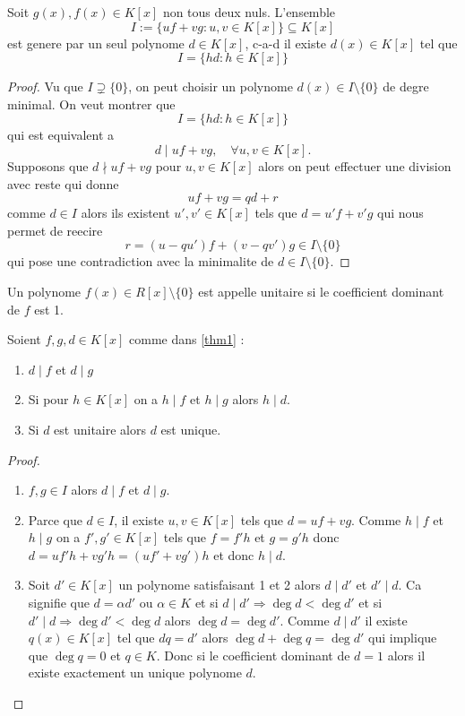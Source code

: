 \begin{theorem}\label{thm1}
Soit $g(x),f(x)\in K[x]$ non tous deux nuls. L'ensemble
$$
I :=  \{uf+vg:u,v\in K[x] \}\subseteq K[x]
$$
est genere par un seul polynome $d\in K[x]$, c-a-d il existe $d(x)\in K[x]$ tel que
$$
I=\{ hd:h\in K[x] \}
$$
\end{theorem}
\begin{proof}
Vu que $I\supsetneq\{ 0 \}$, on peut choisir un polynome $d(x)\in I\setminus \{ 0 \}$ de degre minimal. On veut montrer que 
$$
I=\{ hd:h\in K[x] \}
$$
qui est equivalent a 
$$
d\mid uf+vg,\quad\forall u,v\in K[x].
$$
Supposons que $d\nmid uf+vg$ pour $u,v\in K[x]$ alors on peut effectuer une division avec reste qui donne
$$
uf+vg=qd+r
$$
comme $d\in I$ alors ils existent $u',v'\in K[x]$ tels que $d=u'f+v'g$ qui nous permet de reecire
$$
r=(u-qu')f+(v-qv')g\in I\setminus \{ 0 \}
$$
qui pose une contradiction avec la minimalite de $d\in I\setminus \{ 0 \}$.
\end{proof}
\begin{definition}
Un polynome $f(x)\in R[x]\setminus \{ 0 \}$ est appelle unitaire si le coefficient dominant de $f$ est 1.
\end{definition}
\begin{theorem}
Soient $f,g,d\in K[x]$ comme dans \ref{thm1} :
\begin{enumerate}
\item $d\mid f$ et $d\mid g$
\item Si pour $h\in K[x]$ on a $h\mid f$ et $h\mid g$ alors $h\mid d$.
\item Si $d$ est unitaire alors $d$ est unique.
\end{enumerate}
\end{theorem}
\begin{proof}
\begin{enumerate}
\item $f,g\in I$ alors $d\mid f$ et $d\mid g$.
\item Parce que $d\in I$, il existe $u,v\in K[x]$ tels que $d=uf+vg$. Comme $h\mid f$ et $h\mid g$ on a $f',g'\in K[x]$ tels que $f=f'h$ et $g=g'h$ donc $d=uf'h+vg'h=(uf'+vg')h$ et donc $h\mid d$.
\item Soit $d'\in K[x]$ un polynome satisfaisant 1 et 2 alors $d\mid d'$ et $d'\mid d$. Ca signifie que $d=\alpha d'$ ou $\alpha \in K$ et si $d\mid d'\Rightarrow\deg d<\deg d'$ et si $d'\mid d\Rightarrow\deg d'<\deg d$ alors $\deg d=\deg d'$. Comme $d\mid d'$ il existe $q(x)\in K[x]$ tel que $dq=d'$ alors $\deg d+\deg q =\deg d'$ qui implique que $\deg q=0$ et $q\in K$. Donc si le coefficient dominant de $d=1$ alors il existe exactement un unique polynome $d$.  
\end{enumerate}
\end{proof}
